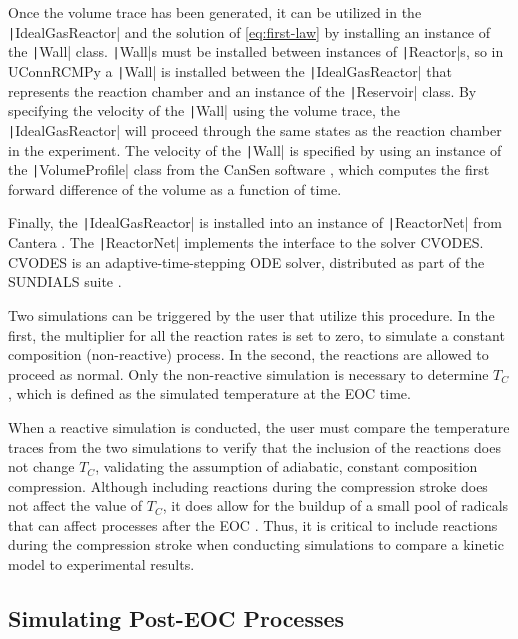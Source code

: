 \documentclass[12pt]{../ussci}
\begin{document}
Once the volume trace has been generated, it can be utilized in the
\texttt|IdealGasReactor| and the solution of \cref{eq:first-law} by installing an instance of the
\texttt|Wall| class. \texttt|Wall|s must be installed between instances
of \texttt|Reactor|s, so in UConnRCMPy a \texttt|Wall| is installed
between the \texttt|IdealGasReactor| that represents the reaction
chamber and an instance of the \texttt|Reservoir| class. By specifying
the velocity of the \texttt|Wall| using the volume trace, the
\texttt|IdealGasReactor| will proceed through the same states as the
reaction chamber in the experiment. The velocity of the \texttt|Wall| is
specified by using an instance of the \texttt|VolumeProfile| class from
the CanSen software \autocite{cansen}, which computes the first forward
difference of the volume as a function of time.

Finally, the \texttt|IdealGasReactor| is installed into an instance of
\texttt|ReactorNet| from Cantera \autocite{cantera}. The
\texttt|ReactorNet| implements the interface to the solver CVODES.
CVODES is an adaptive-time-stepping ODE solver, distributed as part of the
SUNDIALS suite \autocite{Hindmarsh2005}.

Two simulations can be triggered by the user that utilize this
procedure. In the first, the multiplier for all the reaction rates is
set to zero, to simulate a constant composition (non-reactive) process.
In the second, the reactions are allowed to proceed as normal. Only the
non-reactive simulation is necessary to determine \(T_C\), which is
defined as the simulated temperature at the EOC time.

When a reactive simulation is conducted, the user must compare the
temperature traces from the two simulations to verify that the inclusion
of the reactions does not change \(T_C\), validating the assumption of
adiabatic, constant composition compression. Although including
reactions during the compression stroke does not affect the value of
\(T_C\), it does allow for the buildup of a small pool of radicals that
can affect processes after the EOC \autocite{Mittal2008}. Thus, it is
critical to include reactions during the compression stroke when
conducting simulations to compare a kinetic model to experimental
results.

\subsection{Simulating Post-EOC Processes}\label{simulating-post-eoc-processes}
\end{document}
